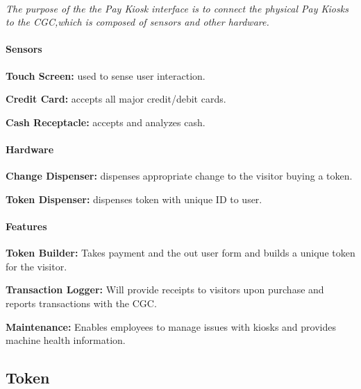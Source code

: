 \documentclass[12pt]{article}
\begin{document}
	\paragraph{} \textit{The purpose of the the Pay Kiosk interface is to connect 
	the physical Pay Kiosks to the CGC,which is composed of sensors and other hardware.}
			
	\paragraph{Sensors}
	\begin{list}{}{}
		\item \textbf{Touch Screen: }used to sense user interaction. 
		\item \textbf{Credit Card: }accepts all major credit/debit cards. 
		\item \textbf{Cash Receptacle: }accepts and analyzes cash. 
	\end{list}
		
	\paragraph{Hardware}
	\begin{list}{}{}
		\item \textbf{Change Dispenser:} dispenses appropriate change to the 
		visitor buying a token.
		\item \textbf{Token Dispenser: } dispenses token with unique ID to user.
	\end{list}

	\paragraph{Features}
	\begin{list}{}{}
		\item \textbf{Token Builder:} Takes payment and the out user form and builds
		a unique token for the visitor.
		\item \textbf{Transaction Logger:} Will provide receipts to visitors upon purchase and 
		reports transactions with the CGC.
		\item \textbf{Maintenance: } Enables employees to manage issues with kiosks 
		and provides machine health information. 
	\end{list}

	\subsection{Token}
\end{document}
